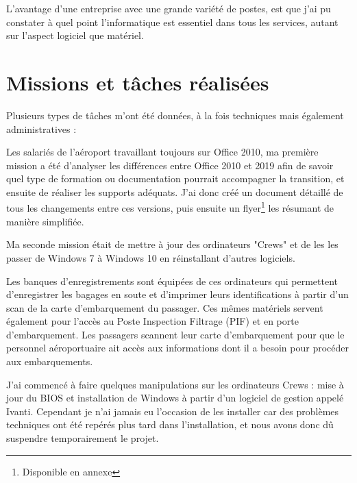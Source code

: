 L'avantage d'une entreprise avec une grande variété de postes, est que j'ai pu constater à quel point l'informatique est essentiel dans tous les services, autant sur l'aspect logiciel que matériel.

\newpage

\section{Missions et tâches réalisées}

Plusieurs types de tâches m’ont été données, à la fois techniques mais également administratives :\newline


Les salariés de l’aéroport travaillant toujours sur Office 2010, ma première mission a été d’analyser les différences entre Office 2010 et 2019 afin de savoir quel type de formation ou documentation pourrait accompagner la transition, et ensuite de réaliser les supports adéquats. J’ai donc créé un document détaillé de tous les changements entre ces versions, puis ensuite un flyer\footnote{Disponible en annexe} les résumant de manière simplifiée.\newline

Ma seconde mission était de mettre à jour des ordinateurs "Crews" et de les les passer de Windows 7 à Windows 10 en réinstallant d’autres logiciels.

Les banques d’enregistrements sont équipées de ces ordinateurs qui permettent d’enregistrer les bagages en soute et d’imprimer leurs identifications à partir d’un scan de la carte d’embarquement du passager. Ces mêmes matériels servent également pour l’accès au Poste Inspection Filtrage (PIF) et en porte d’embarquement. Les passagers scannent leur carte d’embarquement pour que le personnel aéroportuaire ait accès aux informations dont il a besoin pour procéder aux embarquements.

J’ai commencé à faire quelques manipulations sur les ordinateurs Crews : mise à jour du BIOS et installation de Windows à partir d’un logiciel de gestion appelé Ivanti. Cependant je n’ai jamais eu l'occasion de les installer car des problèmes techniques ont été repérés plus tard dans l’installation, et nous avons donc dû suspendre temporairement le projet.

